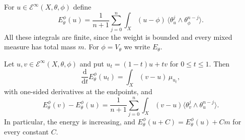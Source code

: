 \begin{definition}\label{def:relative-monge-ampere-energy}
For $u\in\mathcal E^\infty(X,\theta,\phi)$ define
\begin{equation}\label{eq:relative-energy-bounded-type}
 E_\theta^\phi(u)=\frac1{n+1}\sum_{j=0}^n
                  \int_X(u-\phi)\,
                        \langle\theta_u^j\wedge\theta_\phi^{n-j}\rangle.
\end{equation}
All these integrals are finite, since the weight is bounded and every mixed measure has total mass $m$. For $\phi=V_\theta$ we write $E_\theta$.
\end{definition}

\begin{proposition}\label{prop:bounded-type-energy-variation-and-cocycle}
Let $u,v\in\mathcal E^\infty(X,\theta,\phi)$ and put $u_t=(1-t)u+tv$ for $0\leq t\leq1$. Then
\begin{equation}\label{eq:bounded-type-energy-first-variation}
 \frac{\mathrm d}{\mathrm dt}E_\theta^\phi(u_t)
                                   =\int_X(v-u)\,\mu_{u_t},
\end{equation}
with one-sided derivatives at the endpoints, and
\begin{equation}\label{eq:bounded-type-energy-cocycle}
 E_\theta^\phi(v)-E_\theta^\phi(u)
       =\frac1{n+1}\sum_{j=0}^n\int_X(v-u)
                              \langle\theta_v^j\wedge\theta_u^{n-j}\rangle.
\end{equation}
In particular, the energy is increasing, and $E_\theta^\phi(u+C)=E_\theta^\phi(u)+Cm$ for every constant $C$.
\end{proposition}
